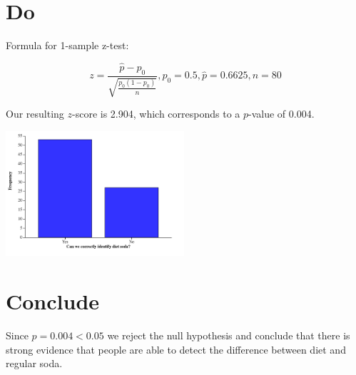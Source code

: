 \documentclass{scrreprt} %
\begin{document}
\section{Do}

Formula for 1-sample z-test:

$$
z=\frac{\hat{p}-p_0}{\sqrt{\frac{p_0(1-p_0)}{n}}}, p_0 = 0.5, \hat{p} = 0.6625, n = 80
$$

Our resulting $z$-score is 2.904, which corresponds to a $p$-value of 0.004.

\includegraphics[width=250px]{2021-08-31-11-24-27.png}

\section{Conclude}

Since $p = 0.004 < 0.05$ we reject the null hypothesis and conclude that there
is strong evidence that people are able to detect the difference between diet
and regular soda.
\end{document}
